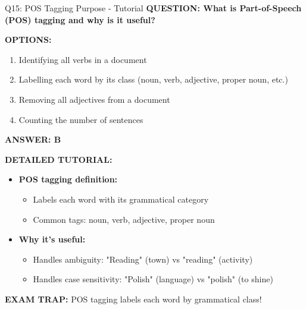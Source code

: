 \documentclass[8pt]{beamer}
\begin{document}
	\begin{frame}{Q15: POS Tagging Purpose - Tutorial}
		\fontsize{6.5}{7.5}\selectfont
		\textbf{QUESTION: What is Part-of-Speech (POS) tagging and why is it useful?}
		
		\vspace{0.1cm}
		\textbf{OPTIONS:}
		\begin{enumerate}
			\item Identifying all verbs in a document
			\item Labelling each word by its class (noun, verb, adjective, proper noun, etc.)
			\item Removing all adjectives from a document
			\item Counting the number of sentences
		\end{enumerate}
		
		\vspace{0.1cm}
		\textcolor{myblue}{\textbf{ANSWER: B}}
		
		\vspace{0.1cm}
		\textbf{DETAILED TUTORIAL:}
		\begin{itemize}
			\item \textbf{POS tagging definition:}
			\begin{itemize}
				\item Labels each word with its grammatical category
				\item Common tags: noun, verb, adjective, proper noun
			\end{itemize}
			\item \textbf{Why it's useful:}
			\begin{itemize}
				\item Handles ambiguity: "Reading" (town) vs "reading" (activity)
				\item Handles case sensitivity: "Polish" (language) vs "polish" (to shine)
			\end{itemize}
		\end{itemize}
		
		\textcolor{myred}{\textbf{EXAM TRAP:}} POS tagging labels \textcolor{myblue}{each word by grammatical class}!
	\end{frame}
	
\end{document}

